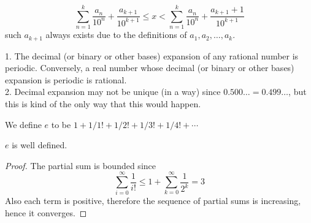 $$\sum_{n=1}^k\frac{a_n}{10^n}+\frac{a_{k+1}}{10^{k+1}}\le x <\sum_{n=1}^k\frac{a_n}{10^n}+\frac{a_{k+1}+1}{10^{k+1}}$$
such $a_{k+1}$ always exists due to the definitions of $a_1,a_2,\ldots,a_k$.
\begin{remark}
    1. The decimal (or binary or other bases) expansion of any rational number is periodic.
    Conversely, a real number whose decimal (or binary or other bases) expansion is periodic is rational.\\
    2. Decimal expansion may not be unique (in a way) since $0.500\ldots =0.499\ldots$, but this is kind of the only way that this would happen.
\end{remark}
\begin{definition}
    We define $e$ to be $1+1/1!+1/2!+1/3!+1/4!+\cdots$
\end{definition}
\begin{proposition}
    $e$ is well defined.
\end{proposition}
\begin{proof}
    The partial sum is bounded since
    $$\sum_{i=0}^\infty\frac{1}{i!}\le 1+\sum_{k=0}^\infty\frac{1}{2^k}=3$$
    Also each term is positive, therefore the sequence of partial sums is increasing, hence it converges.
\end{proof}
